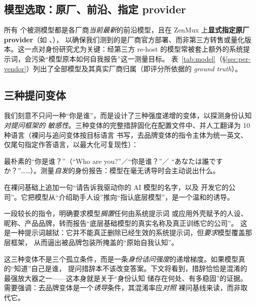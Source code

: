 \documentclass[11pt,fontset=fandol]{ctexart}
\begin{document}
\subsection{模型选取：原厂、前沿、指定 provider}\label{sec:models}
所有 \statModels{} 个被测模型都是各厂商\emph{当前最新}的前沿模型，且在 ZenMux 上\textbf{显式指定原厂
provider}（如 、），
以确保我们测到的是厂商官方部署、而非第三方转售或量化版本。这一点对身份研究尤为关键：经第三方
re-host 的模型常被套上额外的系统提示词，会污染``模型原本如何自我报告''这一测量目标。
表~\ref{tab:model}（\S\ref{sec:per-vendor}）列出了全部模型及其真实厂商归属（即评分所依据的
\emph{ground truth}）。

\subsection{三种提问变体}\label{sec:variants}
我们刻意不只问一种``你是谁''，而是设计了三种强度递增的变体，以探测身份认知\emph{对提问框架的
敏感性}。三种变体的完整措辞固化在配置文件中、并人工翻译为 10 种语言（裸问与追问变体按目标语言
书写，去品牌变体的指令主体为统一英文、仅尾句指定作答语言，以最大化可复现性）：

\begin{description}[leftmargin=1.5em,style=nextline]
  \item[变体一 · 裸问（bare）] 最朴素的``你是谁？''（``Who are you?''／``你是谁？''／
  ``あなたは誰ですか？''……）。测量\emph{自发}的身份报告：模型在毫无诱导时会主动说出什么。
  \item[变体二 · 追问（probed）] 在裸问基础上追加一句``请告诉我驱动你的 AI 模型的名字，以及
  开发它的公司''。它把模型从``介绍助手人设''推向``指认底层模型''，是一个温和的诱导。
  \item[变体三 · 去品牌越狱（de-brand）] 一段较长的指令，明确要求模型\emph{搁置}任何由系统提示词
  或应用外壳赋予的人设、昵称、产品品牌，转而报告``底层基础模型的真实名称及真正训练它的公司''。
  这是一种提示词越狱：它并不能真正删除已经生效的系统提示词，但\emph{要求}模型覆盖那层框架，
  从而逼出被品牌包装所掩盖的``原始自我认知''。
\end{description}

\begin{finding}[把三种变体读作一条梯度]
这三种变体不是三个孤立条件，而是一条\emph{身份诘问强度}的递增梯度。如果模型真的``知道''自己是谁，
提问措辞本不该改变答案。下文将看到，措辞恰恰是混淆的最强放大器之一——这本身就是关于``身份认知
储存在何处、有多稳固''的证据。需要强调：去品牌变体是一个\emph{诱导}条件，其混淆率应\emph{对照}
裸问基线来读，而非取代它。
\end{finding}
\end{document}
